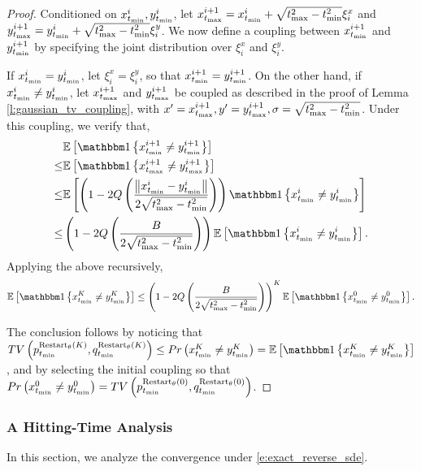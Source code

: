 \begin{proof}
    Conditioned on $x^i_{t_{\textrm{min}}},y^i_{t_{\textrm{min}}}$, let $x^{i+1}_{t_{\textrm{max}}} = x^i_{t_{\textrm{min}}} + \sqrt{t_{\textrm{max}}^2 - t_{\textrm{min}}^2} \xi_i^x$ and $y^{i+1}_{t_{\textrm{max}}} = y^i_{t_{\textrm{min}}} + \sqrt{t_{\textrm{max}}^2 - t_{\textrm{min}}^2} \xi_i^y$. We now define a coupling between $x^{i+1}_{t_{\textrm{min}}}$ and $y^{i+1}_{t_{\textrm{min}}}$ by specifying the joint distribution over $\xi^x_i$ and $\xi^y_i$. 
    
    If $x^i_{t_{\textrm{min}}}=y^i_{t_{\textrm{min}}}$, let $\xi^x_i = \xi^y_i$, so that $x^{i+1}_{t_{\textrm{min}}}=y^{i+1}_{t_{\textrm{min}}}$. On the other hand, if $x^i_{t_{\textrm{min}}} \neq y^i_{t_{\textrm{min}}}$, let $x^{i+1}_{t_{\textrm{max}}}$ and $y^{i+1}_{t_{\textrm{max}}}$ be coupled as described in the proof of Lemma \ref{l:gaussian_tv_coupling}, with $x' = x^{i+1}_{t_{\textrm{max}}}, y' = y^{i+1}_{t_{\textrm{max}}}, \sigma = \sqrt{t_{\textrm{max}}^2 - t_{\textrm{min}}^2}$. Under this coupling, we verify that, 
    \begin{align*}
        & \E{\ind{x^{i+1}_{\tmin} \neq y^{i+1}_{\tmin}}}\\
        \leq & \E{\ind{x^{i+1}_{\tmax} \neq y^{i+1}_{\tmax}}} \\
        \leq& \E{\lrp{1 - 2Q\lrp{\frac{\lrn{x^i_{\tmin} - y^i_{\tmin}}}{{2\sqrt{\tmax^2 - \tmin^2}}}}} \ind{x^{i}_{\tmin} \neq y^{i}_{\tmin}}}\\
        \leq& \lrp{1-2Q\lrp{\frac{B}{{2\sqrt{\tmax^2 - \tmin^2}}}}}\E{\ind{x^{i}_{\tmin} \neq y^{i}_{\tmin}}}.
    \end{align*}
    Applying the above recursively, 
    \begin{align*}
        \E{\ind{x^{K}_{\tmin} \neq y^{K}_{\tmin}}} \leq \lrp{1-2Q\lrp{\frac{B}{{2\sqrt{\tmax^2 - \tmin^2}}}}}^K \E{\ind{x^{0}_{\tmin} \neq y^{0}_{\tmin}}}.
    \end{align*}

    The conclusion follows by noticing that $TV\lrp{p^{\bRestart(K)}_{\tmin},q^{\bRestart(K)}_{\tmin}} \leq  Pr\lrp{x^{K}_{\tmin} \neq y^{K}_{\tmin}} = \E{\ind{x^{K}_{\tmin} \neq y^{K}_{\tmin}}}$, and by selecting the initial coupling so that $Pr\left( x^0_{t_{\textrm{min}}} \neq y^0_{t_{\textrm{min}}} \right) = TV\left( p^{{\textrm{Restart}_\theta}(0)}_{t_{\textrm{min}}},q^{{\textrm{Restart}_\theta}(0)}_{t_{\textrm{min}}} \right)$.
\end{proof}

\iffalse
\subsubsection{A Hitting-Time Analysis}
In this section, we analyze the convergence under \eqref{e:exact_reverse_sde}.

